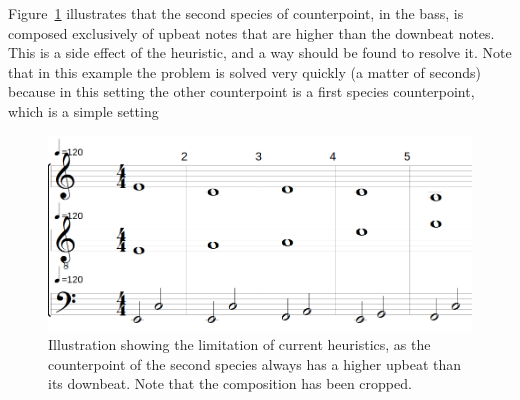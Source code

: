 \begin{itemize}
  Figure~\ref{fig:limitation-lowest-array} illustrates that the second species of counterpoint, in the bass, is composed exclusively of upbeat notes that are higher than the downbeat notes. This is a side effect of the heuristic, and a way should be found to resolve it. Note that in this example the problem is solved very quickly (a matter of seconds) because in this setting the other counterpoint is a first species counterpoint, which is a simple setting
\end{itemize}
\begin{figure}[h]
  \centering
  \includegraphics[width=.6\textwidth]{Images/limitation-with-lowest-array.png}
  \caption{Illustration showing the limitation of current heuristics, as the counterpoint of the second species always has a higher upbeat than its downbeat. Note that the composition has been cropped.}
  \label{fig:limitation-lowest-array}
\end{figure}




